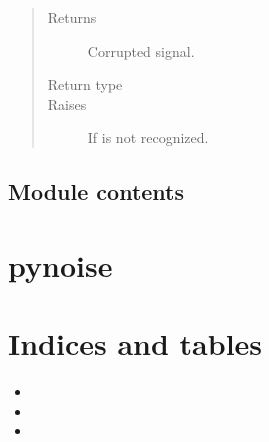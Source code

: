 \documentclass[letterpaper,10pt,english]{sphinxmanual}
\begin{document}
\begin{fulllineitems}
\begin{quote}
\begin{description}
\begin{itemize}
\end{itemize}

\item[{Returns}] \leavevmode
Corrupted signal.

\item[{Return type}] \leavevmode
{}

\item[{Raises}] \leavevmode
{} \textendash{} If  is not recognized.

\end{description}\end{quote}

\end{fulllineitems}



\section{Module contents}
\label{\detokenize{pynoise:module-pynoise}}\label{\detokenize{pynoise:module-contents}}

\chapter{pynoise}
\label{\detokenize{modules:pynoise}}\label{\detokenize{modules::doc}}

\chapter{Indices and tables}
\label{\detokenize{index:indices-and-tables}}\begin{itemize}
\item {} 

\item {} 

\item {} 

\end{itemize}


\renewcommand{\indexname}{Python Module Index}
\begin{sphinxtheindex}
\let\bigletter\sphinxstyleindexlettergroup
\bigletter{n}
\item\relax{}
\indexspace
\bigletter{p}
\item\relax{}
\item\relax{}
\end{sphinxtheindex}

\renewcommand{\indexname}{Index}
\printindex
\end{document}
